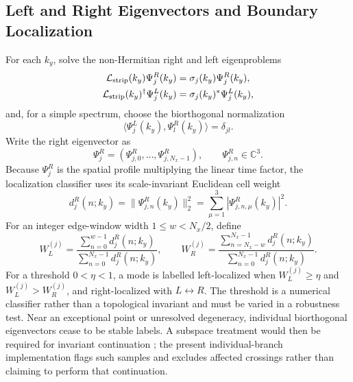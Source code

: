 \documentclass[11pt]{article}
\numberwithin{equation}{section}
\begin{document}
\subsection{Left and Right Eigenvectors and Boundary Localization}

For each $k_y$, solve the non-Hermitian right and left eigenproblems
\begin{align}
  \mathcal L_{\rm strip}(k_y)\Psi_j^R(k_y)
  &=\sigma_j(k_y)\Psi_j^R(k_y),\nonumber\\
  \mathcal L_{\rm strip}(k_y)^\dagger\Psi_j^L(k_y)
  &=\sigma_j(k_y)^*\Psi_j^L(k_y),
  \label{eq:strip_left_right_eigenvectors}
\end{align}
and, for a simple spectrum, choose the biorthogonal normalization
\begin{equation}
  \langle\Psi_j^L(k_y),\Psi_l^R(k_y)\rangle=\delta_{jl}.
  \label{eq:strip_biorthogonal_normalization}
\end{equation}
Write the right eigenvector as
\begin{equation}
  \Psi_j^R=(\Psi_{j,0}^R,\ldots,\Psi_{j,N_x-1}^R),
  \qquad \Psi_{j,n}^R\in\mathbb C^3.
\end{equation}
Because $\Psi_j^R$ is the spatial profile multiplying the linear time
factor, the localization classifier uses its scale-invariant Euclidean
cell weight
\begin{equation}
  d_j^R(n;k_y)=\|\Psi_{j,n}^R(k_y)\|_2^2
  =\sum_{\mu=1}^3|\Psi_{j,n,\mu}^R(k_y)|^2.
\end{equation}
For an integer edge-window width $1\leq w<N_x/2$, define
\begin{equation}
  W_L^{(j)}=
  \frac{\sum_{n=0}^{w-1}d_j^R(n;k_y)}
       {\sum_{n=0}^{N_x-1}d_j^R(n;k_y)},
  \qquad
  W_R^{(j)}=
  \frac{\sum_{n=N_x-w}^{N_x-1}d_j^R(n;k_y)}
       {\sum_{n=0}^{N_x-1}d_j^R(n;k_y)}.
  \label{eq:strip_edge_weights}
\end{equation}
For a threshold $0<\eta<1$, a mode is labelled left-localized when
$W_L^{(j)}\geq\eta$ and $W_L^{(j)}>W_R^{(j)}$, and right-localized with
$L\leftrightarrow R$.  The threshold is a numerical classifier rather
than a topological invariant and must be varied in a robustness test.
Near an exceptional point or unresolved degeneracy, individual
biorthogonal eigenvectors cease to be stable labels. A subspace treatment
would then be required for invariant continuation \cite{Kunst2018}; the
present individual-branch implementation flags such samples and excludes
affected crossings rather than claiming to perform that continuation.
\end{document}
